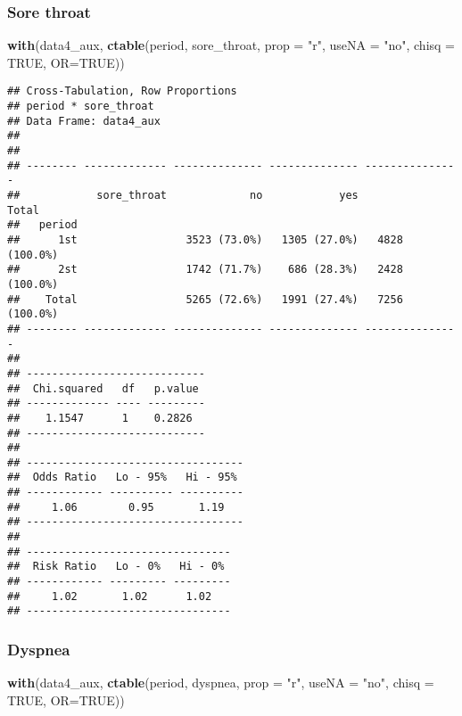 \documentclass[
]{article}
\newenvironment{Shaded}{\begin{snugshade}}{\end{snugshade}}
\newcommand{\DataTypeTok}[1]{\textcolor[rgb]{0.13,0.29,0.53}{#1}}
\newcommand{\KeywordTok}[1]{\textcolor[rgb]{0.13,0.29,0.53}{\textbf{#1}}}
\newcommand{\NormalTok}[1]{#1}
\newcommand{\OtherTok}[1]{\textcolor[rgb]{0.56,0.35,0.01}{#1}}
\newcommand{\StringTok}[1]{\textcolor[rgb]{0.31,0.60,0.02}{#1}}
\begin{document}
\hypertarget{sore-throat-2}{%
\subsubsection{Sore throat}\label{sore-throat-2}}

\begin{Shaded}
\begin{Highlighting}[]
\KeywordTok{with}\NormalTok{(data4_aux, }\KeywordTok{ctable}\NormalTok{(period, sore_throat, }\DataTypeTok{prop =} \StringTok{"r"}\NormalTok{, }\DataTypeTok{useNA =} \StringTok{"no"}\NormalTok{, }\DataTypeTok{chisq =} \OtherTok{TRUE}\NormalTok{, }\DataTypeTok{OR=}\OtherTok{TRUE}\NormalTok{))}
\end{Highlighting}
\end{Shaded}

\begin{verbatim}
## Cross-Tabulation, Row Proportions  
## period * sore_throat  
## Data Frame: data4_aux  
## 
## 
## -------- ------------- -------------- -------------- ---------------
##            sore_throat             no            yes           Total
##   period                                                            
##      1st                 3523 (73.0%)   1305 (27.0%)   4828 (100.0%)
##      2st                 1742 (71.7%)    686 (28.3%)   2428 (100.0%)
##    Total                 5265 (72.6%)   1991 (27.4%)   7256 (100.0%)
## -------- ------------- -------------- -------------- ---------------
## 
## ----------------------------
##  Chi.squared   df   p.value 
## ------------- ---- ---------
##    1.1547      1    0.2826  
## ----------------------------
## 
## ----------------------------------
##  Odds Ratio   Lo - 95%   Hi - 95% 
## ------------ ---------- ----------
##     1.06        0.95       1.19   
## ----------------------------------
## 
## --------------------------------
##  Risk Ratio   Lo - 0%   Hi - 0% 
## ------------ --------- ---------
##     1.02       1.02      1.02   
## --------------------------------
\end{verbatim}

\hypertarget{dyspnea-2}{%
\subsubsection{Dyspnea}\label{dyspnea-2}}

\begin{Shaded}
\begin{Highlighting}[]
\KeywordTok{with}\NormalTok{(data4_aux, }\KeywordTok{ctable}\NormalTok{(period, dyspnea, }\DataTypeTok{prop =} \StringTok{"r"}\NormalTok{, }\DataTypeTok{useNA =} \StringTok{"no"}\NormalTok{, }\DataTypeTok{chisq =} \OtherTok{TRUE}\NormalTok{, }\DataTypeTok{OR=}\OtherTok{TRUE}\NormalTok{))}
\end{Highlighting}
\end{Shaded}
\end{document}
